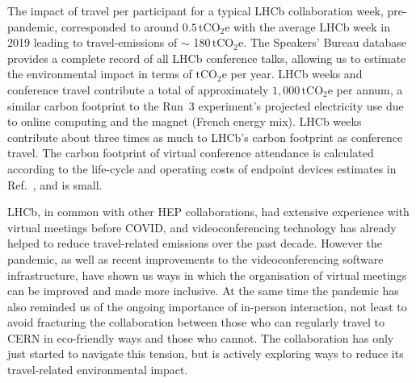 \documentclass[../SustainableHEP.tex]{subfiles}
\begin{document}
\begin{casestudy}
The impact of travel per participant for a typical LHCb collaboration week, pre-pandemic, corresponded to around $0.5\,\mathrm{tCO_2e}$ with the average LHCb week in 2019 leading to travel-emissions of $\sim$ 180$\,\mathrm{tCO_2e}$. The Speakers' Bureau database provides a complete record of all LHCb conference talks, allowing us to estimate the environmental impact in terms of   $\mathrm{tCO_2e}$ per year. LHCb weeks and conference travel contribute a total of approximately $1,000\,\mathrm{tCO_2e}$ per annum, a similar carbon footprint to the Run~3 experiment's projected electricity use due to online computing and the magnet (French energy mix). LHCb weeks contribute about three times as much to  LHCb's carbon footprint as conference travel.
 The carbon footprint of virtual conference attendance is calculated according to the life-cycle and operating costs of endpoint devices estimates in Ref.~\cite{VideoConCO2}, and is small.

LHCb, in common with other HEP collaborations, had extensive experience with virtual meetings before COVID, and videoconferencing
technology has already helped to reduce travel-related emissions over the past decade.
However the pandemic, as well as recent improvements to the videoconferencing software infrastructure, have shown us ways 
in which the organisation of virtual meetings can be improved and made more inclusive. 
At the same time the pandemic has also reminded us of the ongoing importance of in-person interaction,
not least to avoid fracturing the collaboration between those who can regularly travel to CERN in eco-friendly ways and those who cannot.
The collaboration has only just started to navigate this tension, but is actively exploring ways to reduce its 
travel-related environmental impact.

\end{casestudy}
\end{document}
